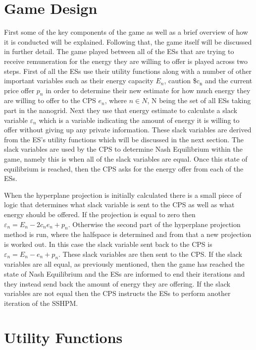 \documentclass[a4paper, notitlepage]{report}
\begin{document}
\section{Game Design}
\label{sec:orge979721}
First some of the key components of the game as well as a brief overview of how
it is conducted will be explained. Following that, the game itself will be
discussed in further detail. The game played between all of the ESs that are
trying to receive remuneration for the energy they are willing to offer is
played across two steps. First of all the ESs use their utility functions along
with a number of other important variables such as their energy capacity \(E_n\),
caution \$c\(_{\text{n}}\) and the current price offer \(p_n\) in order to determine their new
estimate for how much energy they are willing to offer to the CPS \(e_n\), where
\(n \in N\), N being the set of all ESs taking part in the nanogrid. Next they use
that energy estimate to calculate a slack variable \(\varepsilon_n\) which is a
variable indicating the amount of energy it is willing to offer without giving
up any private information. These slack variables are derived from the ES's
utility functions which will be discussed in the next section. The slack
variables are used by the CPS to determine Nash Equilibrium within the game,
namely this is when all of the slack variables are equal. Once this state of
equilibrium is reached, then the CPS asks for the energy offer from each of the
ESs.

When the hyperplane projection is initially calculated there is a small piece of
logic that determines what slack variable is sent to the CPS as well as what
energy should be offered. If the projection is equal to zero then \(\varepsilon_n = E_n -
2c_{n}e_{n} + p_n\). Otherwise the second part of the hyperplane projection method is
run, where the halfspace is determined and from that a new projection is worked
out. In this case the slack variable sent back to the CPS is \(\varepsilon_n = E_n - e_n +
p_n\). These slack variables are then sent to the CPS. If the slack variables are
all equal, as previously mentioned, then the game has reached the state of Nash
Equilibrium and the ESs are informed to end their iterations and they instead
send back the amount of energy they are offering. If the slack variables are not
equal then the CPS instructs the ESs to perform another iteration of the SSHPM.
\section{Utility Functions}
\label{sec:org0c24315}
\end{document}
